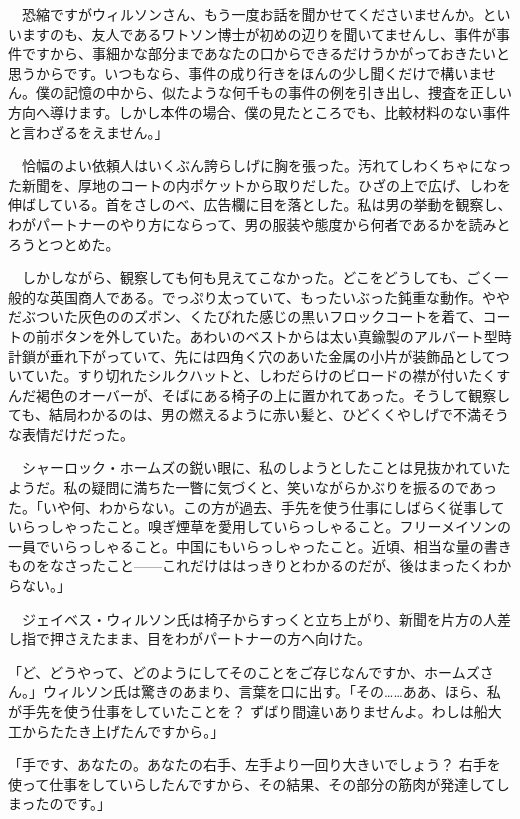 \documentclass[tate,paper=b6j,jafontsize=9pt]{jlreq}
\begin{document}
　恐縮ですがウィルソンさん、もう一度お話を聞かせてくださいませんか。といいますのも、友人であるワトソン博士が初めの辺りを聞いてませんし、事件が事件ですから、事細かな部分まであなたの口からできるだけうかがっておきたいと思うからです。いつもなら、事件の成り行きをほんの少し聞くだけで構いません。僕の記憶の中から、似たような何千もの事件の例を引き出し、捜査を正しい方向へ導けます。しかし本件の場合、僕の見たところでも、比較材料のない事件と言わざるをえません。」


　恰幅のよい依頼人はいくぶん誇らしげに胸を張った。汚れてしわくちゃになった新聞を、厚地のコートの内ポケットから取りだした。ひざの上で広げ、しわを伸ばしている。首をさしのべ、広告欄に目を落とした。私は男の挙動を観察し、わがパートナーのやり方にならって、男の服装や態度から何者であるかを読みとろうとつとめた。

　しかしながら、観察しても何も見えてこなかった。どこをどうしても、ごく一般的な英国商人である。でっぷり太っていて、もったいぶった鈍重な動作。ややだぶついた灰色ののズボン、くたびれた感じの黒いフロックコートを着て、コートの前ボタンを外していた。あわいのベストからは太い真鍮製のアルバート型時計鎖が垂れ下がっていて、先には四角く穴のあいた金属の小片が装飾品としてついていた。すり切れたシルクハットと、しわだらけのビロードの襟が付いたくすんだ褐色のオーバーが、そばにある椅子の上に置かれてあった。そうして観察しても、結局わかるのは、男の燃えるように赤い髪と、ひどくくやしげで不満そうな表情だけだった。

　シャーロック・ホームズの鋭い眼に、私のしようとしたことは見抜かれていたようだ。私の疑問に満ちた一瞥に気づくと、笑いながらかぶりを振るのであった。「いや何、わからない。この方が過去、手先を使う仕事にしばらく従事していらっしゃったこと。嗅ぎ煙草を愛用していらっしゃること。フリーメイソンの一員でいらっしゃること。中国にもいらっしゃったこと。近頃、相当な量の書きものをなさったこと------これだけははっきりとわかるのだが、後はまったくわからない。」

　ジェイベス・ウィルソン氏は椅子からすっくと立ち上がり、新聞を片方の人差し指で押さえたまま、目をわがパートナーの方へ向けた。

「ど、どうやって、どのようにしてそのことをご存じなんですか、ホームズさん。」ウィルソン氏は驚きのあまり、言葉を口に出す。「その……ああ、ほら、私が手先を使う仕事をしていたことを？ ずばり間違いありませんよ。わしは船大工からたたき上げたんですから。」

「手です、あなたの。あなたの右手、左手より一回り大きいでしょう？ 右手を使って仕事をしていらしたんですから、その結果、その部分の筋肉が発達してしまったのです。」
\end{document}
